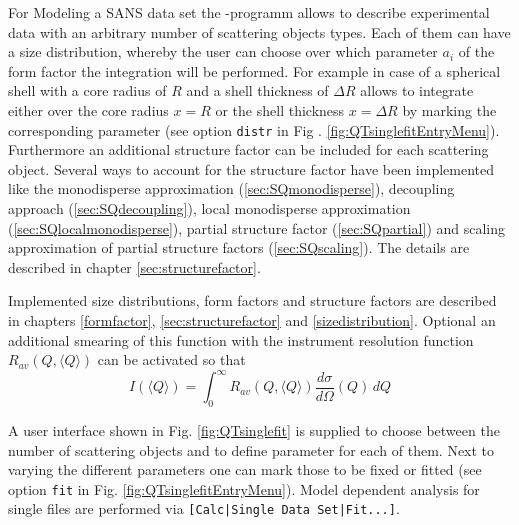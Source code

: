For Modeling a SANS data set the \SASfit-programm allows to
describe experimental data with an arbitrary number of scattering
objects types. Each of them can have a size distribution, whereby
the user can choose over which parameter $a_i$ of the form factor
the integration will be performed. For example in case of a
spherical shell with a core radius of $R$ and a shell thickness of
$\Delta R$ \SASfit allows to integrate either over the core
radius $x=R$ or the shell thickness $x=\Delta R$ by marking the
corresponding parameter (see option {\tt distr} in Fig .
\ref{fig:QTsinglefitEntryMenu}). Furthermore an additional structure factor
can be included for each scattering object. Several ways to account
for the structure factor have been implemented like the monodisperse
approximation (\ref{sec:SQmonodisperse}), decoupling approach
(\ref{sec:SQdecoupling}), local monodisperse approximation
(\ref{sec:SQlocalmonodisperse}), partial structure factor
(\ref{sec:SQpartial}) and scaling approximation of partial structure
factors (\ref{sec:SQscaling}). The details are described in chapter
\ref{sec:structurefactor}.

Implemented size distributions, form factors and structure factors
are described in chapters \ref{formfactor},
\ref{sec:structurefactor} and \ref{sizedistribution}. Optional an
additional smearing of this function with the instrument resolution
function $R_{av}\left(Q,\langle Q\rangle\right)$ can be activated so
that
\begin{equation}
I(\langle Q\rangle) = \int_0^\infty R_{av}\left(Q,\langle
Q\rangle\right) \frac{d\sigma}{d\Omega}(Q) \, dQ
\end{equation}

A user interface shown in Fig. \ref{fig:QTsinglefit} is supplied to
choose between the number of scattering objects and to define
parameter for each of them. Next to varying the different parameters
one can mark those to be fixed or fitted (see option {\tt fit} in Fig.
\ref{fig:QTsinglefitEntryMenu}). Model dependent analysis for single files
are performed via \verb"[Calc|Single Data Set|Fit...]".

